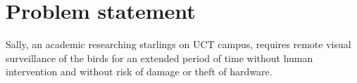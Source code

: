 \documentclass[class=report,11pt,crop=false]{standalone}
\begin{document}
\chapter{Problem statement}

Sally, an academic researching starlings on UCT campus, requires remote visual surveillance of the birds for an extended period of time without human intervention and without risk of damage or theft of hardware.


\ifstandalone

\printnoidxglossary[type=\acronymtype,nonumberlist]
\fi
\end{document}
